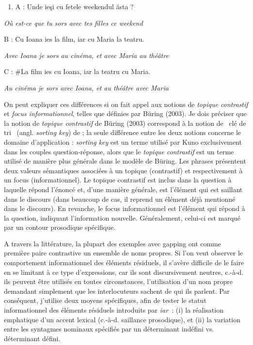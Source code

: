 \begin{enumerate}
\item \label{bkm:Ref289643809}A :  Unde ieşi cu fetele weekendul ăsta ?


\end{enumerate}
{\itshape
Où est-ce que tu sors avec tes filles ce weekend}

  B :  Cu Ioana ies la film, iar cu Maria la teatru. 

{\itshape
Avec Ioana je sors au cinéma, et avec Maria au théâtre } 

  C :  \#La film ies cu Ioana, iar la teatru cu Maria. 

{\itshape
Au cinéma je sors avec Ioana, et au théâtre avec Maria } 

On peut expliquer ces différences si on fait appel aux notions de \textit{topique contrastif} et \textit{focus informationnel}, telles que définies par Büring (2003). Je dois préciser que la notion de \textit{topique contrastif} de Büring (2003) correspond à la notion de {\guillemotleft}~clé de tri~{\guillemotright} (angl. \textit{sorting key}) de \citet{Kuno1982} ; la seule différence entre les deux notions concerne le domaine d'application : \textit{sorting key} est un terme utilisé par Kuno exclusivement dans les couples question-réponse, alors que le \textit{topique contrastif} est un terme utilisé de manière plus générale dans le modèle de Büring. Les phrases présentent deux valeurs sémantiques associées à un topique (contrastif) et respectivement à un focus (informationnel). Le topique contrastif est inclus dans la question à laquelle répond l'énoncé et, d'une manière générale, est l'élément qui est saillant dans le discours (dans beaucoup de cas, il reprend un élément déjà mentionné dans le discours). En revanche, le focus informationnel est l'élément qui répond à la question, indiquant l'information nouvelle. Généralement, celui-ci est marqué par un contour prosodique spécifique. 

A travers la littérature, la plupart des exemples avec gapping ont comme première paire contrastive un ensemble de noms propres. Si l'on veut observer le comportement informationnel des éléments résiduels, il s'avère difficile de le faire en se limitant à ce type d'expressions, car ils sont discursivement neutres, c.-à-d. ils peuvent être utilisés en toutes circonstances, l'utilisation d'un nom propre demandant simplement que les interlocuteurs sachent de qui ils parlent. Par conséquent, j'utilise deux moyens spécifiques, afin de tester le statut informationnel des éléments résiduels introduits par \textit{iar~}: (i) la réalisation emphatique d'un accent lexical (c.-à-d. saillance prosodique), et (ii) la variation entre les syntagmes nominaux spécifiés par un déterminant indéfini vs. déterminant défini. 

